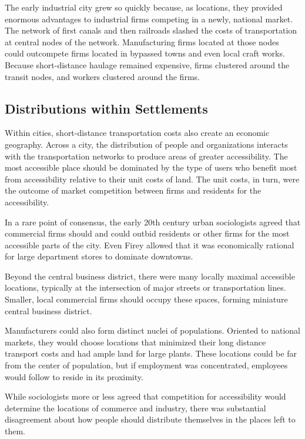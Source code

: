 The early industrial city grew so quickly because, as locations, they
provided enormous advantages to industrial firms competing in a newly,
national market. The network of first canals and then railroads
slashed the costs of transportation at central nodes of the
network. Manufacturing firms located at those nodes could outcompete
firms located in bypassed towns and even local craft works. Because
short-distance haulage remained expensive, firms clustered around the
transit nodes, and workers clustered around the
firms.\cite{hawley_urban_1981,cronon_natures_1992}

\subsection*{Distributions within Settlements}
Within cities, short-distance transportation costs also create an economic
geography. Across a city, the distribution of people and organizations
interacts with the transportation networks to produce areas of greater
accessibility. The most accessible place should be dominated by the
type of users who benefit most from accessibility relative to their
unit costs of land.\cite{alonso_theory_1960} The unit costs, in turn, were the
outcome of market competition between firms and residents for the
accessibility.

In a rare point of consensus, the early 20th century urban
sociologists agreed that commercial firms should and could outbid
residents or other firms for the most accessible parts of the
city.\cite{park_growth_1984,harris_nature_1945} Even Firey allowed that
it was economically rational for large department stores to dominate
downtowns.\cite{firey_land_1947}

Beyond the central business district, there were many locally maximal
accessible locations, typically at the intersection of major streets
or transportation lines. Smaller, local commercial firms should occupy
these spaces, forming miniature central business district.\cite{hoyt_one_1970}

Manufacturers could also form distinct nuclei of populations. Oriented
to national markets, they would choose locations that minimized their
long distance transport costs and had ample land for large
plants. These locations could be far from the center of population,
but if employment was concentrated, employees would follow to reside
in its proximity.

While sociologists more or less agreed that competition for
accessibility would determine the locations of commerce and industry,
there was substantial disagreement about how people should distribute
themselves in the places left to them.

